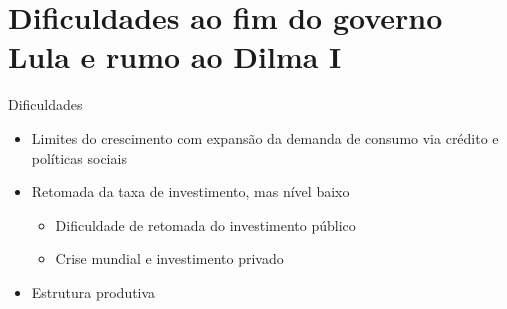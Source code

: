 \documentclass[presentation]{beamer}
\begin{document}
\section{Dificuldades ao fim do governo Lula e rumo ao Dilma I}
\label{sec:org93d1b6e}

\begin{frame}[label={sec:orga106616}]{Dificuldades}
\begin{itemize}
\item Limites do crescimento com expansão da demanda de consumo via crédito e políticas sociais
\item Retomada da taxa de investimento, mas nível baixo
\begin{itemize}
\item Dificuldade de retomada do investimento público
\item Crise mundial e investimento privado
\end{itemize}
\item Estrutura produtiva
\end{itemize}
\end{frame}
\end{document}
